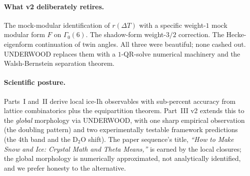 \documentclass[11pt,letterpaper]{article}
\theoremstyle{plain}
\theoremstyle{definition}
\begin{document}
\paragraph{What v2 deliberately retires.}
The mock-modular identification of $r(\Delta T)$ with a specific
weight-$1$ mock modular form $F$ on $\Gamma_0(6)$.  The shadow-form
weight-$3/2$ correction.  The Hecke-eigenform continuation of twin
angles.  All three were beautiful; none cashed out.  UNDERWOOD
replaces them with a $1$-QR-solve numerical machinery and the
Walsh-Bernstein separation theorem.

\paragraph{Scientific posture.}
Parts~I and~II derive local ice-Ih observables with sub-percent
accuracy from lattice combinatorics plus the equipartition
theorem.  Part~III v2 extends this to the \emph{global} morphology
via UNDERWOOD, with one sharp empirical observation (the doubling
pattern) and two experimentally testable framework predictions
(the 4th band and the D$_2$O shift).  The paper sequence's title,
\emph{``How to Make Snow and Ice: Crystal Math and Theta Means,''}
is earned by the local closures; the global morphology is
numerically approximated, not analytically identified, and we
prefer honesty to the alternative.
\end{document}
